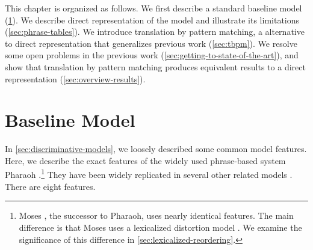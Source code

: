 This chapter is organized as follows.  We first describe a standard
baseline model (\textsection\ref{sec:overview-baseline}).  We
describe direct representation of the model and illustrate its limitations (\textsection\ref{sec:phrase-tables}).  We introduce translation by
pattern matching, a alternative to direct representation that 
generalizes previous work (\textsection\ref{sec:tbpm}).
We resolve some open problems in the previous
work (\textsection\ref{sec:getting-to-state-of-the-art}), 
and show that translation by pattern matching produces
equivalent results to a direct representation 
(\textsection\ref{sec:overview-results}).

\section{Baseline Model} \label{sec:overview-baseline}

In \textsection\ref{sec:discriminative-models}, we loosely described some
common model features.  Here, we describe
the exact features of the widely used phrase-based system
Pharaoh \citep{Koehn:2004:amta}.\footnote{
Moses \citep{Koehn:2007:acl-demo}, the successor to Pharaoh, uses nearly identical features.
The main difference is that Moses uses a lexicalized distortion model \citep{Tillman:2004:hlt-naacl,Koehn:2005:iwslt}.  We examine the significance of
this difference in \textsection\ref{sec:lexicalized-reordering}.}
They have been widely replicated in several other
related models \cite[see, e.g.][]{Chiang:2005:acl,Chiang:2007:cl,Simard:2005:hlt-emnlp}.
There are eight features.

